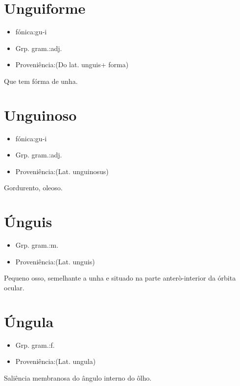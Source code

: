 \documentclass{article}
\begin{document}
\section{Unguiforme}
\begin{itemize}
\item {fónica:gu-i}
\end{itemize}
\begin{itemize}
\item {Grp. gram.:adj.}
\end{itemize}
\begin{itemize}
\item {Proveniência:(Do lat. \textunderscore unguis\textunderscore  + \textunderscore forma\textunderscore )}
\end{itemize}
Que tem fórma de unha.
\section{Unguinoso}
\begin{itemize}
\item {fónica:gu-i}
\end{itemize}
\begin{itemize}
\item {Grp. gram.:adj.}
\end{itemize}
\begin{itemize}
\item {Proveniência:(Lat. \textunderscore unguinosus\textunderscore )}
\end{itemize}
Gordurento, oleoso.
\section{Únguis}
\begin{itemize}
\item {Grp. gram.:m.}
\end{itemize}
\begin{itemize}
\item {Proveniência:(Lat. \textunderscore unguis\textunderscore )}
\end{itemize}
Pequeno osso, semelhante a unha e situado na parte anterò-interior da órbita ocular.
\section{Úngula}
\begin{itemize}
\item {Grp. gram.:f.}
\end{itemize}
\begin{itemize}
\item {Proveniência:(Lat. \textunderscore ungula\textunderscore )}
\end{itemize}
Saliência membranosa do ângulo interno do ôlho.
\end{document}
